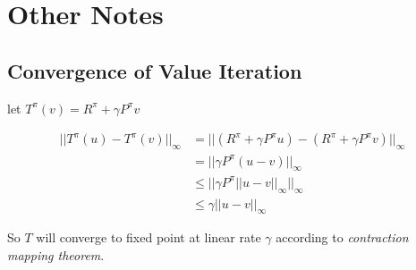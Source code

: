 \section{Other Notes}

\subsection{Convergence of Value Iteration}

let $T^\pi(v) = R^\pi + \gamma P^\pi v$

\begin{equation}
	\begin{aligned}
		||T^\pi(u) - T^\pi(v)||_{\infty} &= ||(R^\pi + \gamma P^\pi u) - (R^\pi + \gamma P^\pi v) ||_\infty \\
		&= ||\gamma P^\pi (u-v) ||_\infty \\
		&\leq || \gamma P^\pi ||u-v ||_\infty ||_\infty \\
		&\leq \gamma ||u-v||_\infty
	\end{aligned}
\end{equation}

So $T$ will converge to fixed point at linear rate $\gamma$ according to \emph{contraction mapping theorem}.